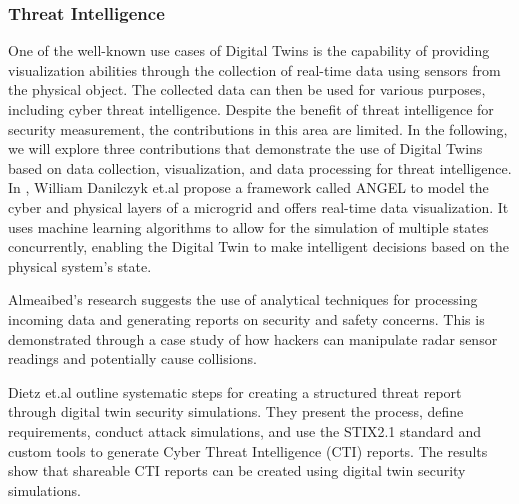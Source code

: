 

\subsubsection{Threat Intelligence}

One of the well-known use cases of Digital Twins is the capability of providing visualization abilities through the collection of real-time data using sensors from the physical object. The collected data can then be used for various purposes, including cyber threat intelligence. Despite the benefit of threat intelligence for security measurement, the contributions in this area are limited. In the following, we will explore three contributions that demonstrate the use of Digital Twins based on data collection, visualization, and data processing for threat intelligence.  
In \cite{williamdanilczykANGELIntelligentDigital2019}, William Danilczyk et.al propose a framework called ANGEL to model the cyber and physical layers of a microgrid and offers real-time data visualization. It uses machine learning algorithms to allow for the simulation of multiple states concurrently, enabling the Digital Twin to make intelligent decisions based on the physical system's state.  

Almeaibed's \cite{almeaibedDigitalTwinAnalysis2021} research suggests the use of analytical techniques for processing incoming data and generating reports on security and safety concerns. This is demonstrated through a case study of how hackers can manipulate radar sensor readings and potentially cause collisions.  

Dietz et.al \cite{dietzHarnessingDigitalTwin2022} outline systematic steps for creating a structured threat report through digital twin security simulations. They present the process, define requirements, conduct attack simulations, and use the STIX2.1 standard and custom tools to generate Cyber Threat Intelligence (CTI) reports. The results show that shareable CTI reports can be created using digital twin security simulations.  

